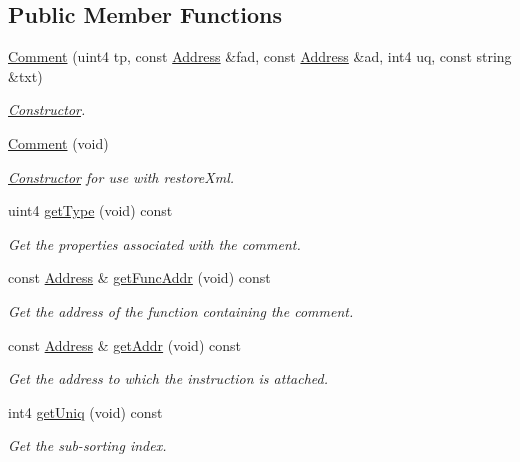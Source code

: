 \subsection*{Public Member Functions}
\begin{DoxyCompactItemize}
\item 
\mbox{\hyperlink{class_comment_a5024dcd72ff2e00ddbee25bfbad62cfc}{Comment}} (uint4 tp, const \mbox{\hyperlink{class_address}{Address}} \&fad, const \mbox{\hyperlink{class_address}{Address}} \&ad, int4 uq, const string \&txt)
\begin{DoxyCompactList}\small\item\em \mbox{\hyperlink{class_constructor}{Constructor}}. \end{DoxyCompactList}\item 
\mbox{\hyperlink{class_comment_a141c30069edb69bc4c886394f8deb6b7}{Comment}} (void)
\begin{DoxyCompactList}\small\item\em \mbox{\hyperlink{class_constructor}{Constructor}} for use with restore\+Xml. \end{DoxyCompactList}\item 
uint4 \mbox{\hyperlink{class_comment_ab9f9f0db0645eef88a8259c34f414102}{get\+Type}} (void) const
\begin{DoxyCompactList}\small\item\em Get the properties associated with the comment. \end{DoxyCompactList}\item 
const \mbox{\hyperlink{class_address}{Address}} \& \mbox{\hyperlink{class_comment_a0eccc5786c949590857ff8ed9e1dadbf}{get\+Func\+Addr}} (void) const
\begin{DoxyCompactList}\small\item\em Get the address of the function containing the comment. \end{DoxyCompactList}\item 
const \mbox{\hyperlink{class_address}{Address}} \& \mbox{\hyperlink{class_comment_abdcb4c6ccdf8d7c9c5652c4d357c0ed6}{get\+Addr}} (void) const
\begin{DoxyCompactList}\small\item\em Get the address to which the instruction is attached. \end{DoxyCompactList}\item 
int4 \mbox{\hyperlink{class_comment_aeff445ce0114bebb017213c4abfe0086}{get\+Uniq}} (void) const
\begin{DoxyCompactList}\small\item\em Get the sub-\/sorting index. \end{DoxyCompactList}\item 

\end{DoxyCompactItemize}
